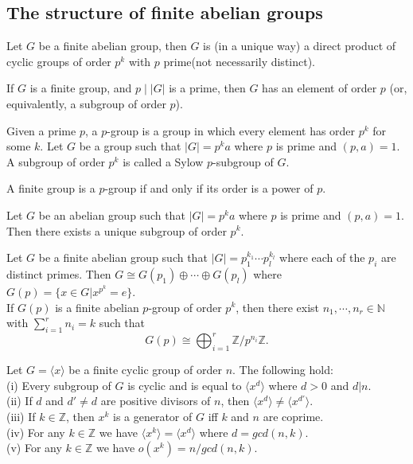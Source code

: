 \subsection{The structure of finite abelian groups}
\begin{theorem}
	Let $G$ be a finite abelian group, then $G$ is (in a unique way) a direct product
of cyclic groups of order $p^k$ with $p$ prime(not necessarily distinct).
\end{theorem}

\begin{theorem}[Cauchy]
	If $G$ is a finite group, and $p \mid |G|$ is a prime, then $G$ has an element of
order $p$ (or, equivalently, a subgroup of order $p$).
\end{theorem}
\begin{definition}
	Given a prime $p$, a $p$-group is a group in which every element has order $p^k$ for some $k$. Let $G$ be a group such that $|G| = p^ka$ where $p$ is prime and $(p, a)=1$. A subgroup
of order $p^k$ is called a Sylow $p$-subgroup of $G$.
\end{definition}
\begin{corollary}
	A finite group is a $p$-group if and only if its order is a power of $p$.
\end{corollary}
\begin{lemma}
	Let $G$ be an abelian group such that $|G| = p^ka$ where $p$ is prime and $(p, a)=1$. Then
there exists a unique subgroup of order $p^k$.
\end{lemma}

\begin{theorem}
	Let $G$ be a finite abelian group such that $|G| = p_1^{k_1}\cdots p_l^{k_l}$ where each of the $p_i$ are distinct primes. Then $G \cong G(p_1) \oplus \cdots\oplus G(p_l)$ where $G(p) = \{x \in G|x^{p^k}	= e\}$.\\
	If $G(p)$ is a finite abelian $p$-group of order $p^k$, then there exist $n_1,\cdots,n_r \in \mathbb{N}$  with $\sum_{i=1}^r n_i =k$ such that 
	\[G(p)\cong \bigoplus_{i=1}^r \mathbb{Z}/p^{n_i}\mathbb{Z}.\]
\end{theorem}
\begin{theorem}
	Let $G = \langle x\rangle$ be a finite cyclic group of order $n$. The following hold:\\
(i) Every subgroup of $G$ is cyclic and is equal to $\langle x^d \rangle$ where $d > 0$ and $d | n$.\\
(ii) If $d$ and $d'\neq d$ are positive divisors of $n$, then $\langle x^d \rangle \neq\langle x^{d'} \rangle$.\\
(iii) If $k \in \mathbb{Z}$, then $x^k$ is a generator of $G$ iff $k$ and $n$ are coprime.\\
(iv) For any $k \in \mathbb{Z}$ we have $\langle x^k \rangle=\langle x^{d} \rangle$ where $d = gcd(n, k)$.\\
(v) For any $k \in \mathbb{Z}$ we have $o(x^k) = n/gcd(n,k)$.
\end{theorem}

